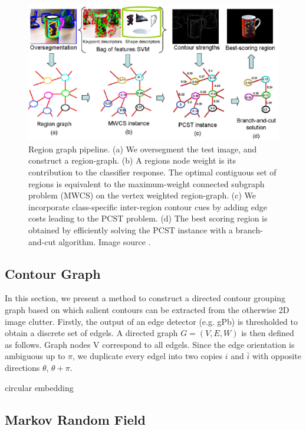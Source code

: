 \documentclass{SMBV12}
\begin{document}
\begin{figure}[htbp]
    \centering
    \includegraphics[width=\textwidth]{images/region_graph1.png}
    \caption{Region graph pipeline. (a) We oversegment the test image, and construct a region-graph. (b) A region\textquotesingle s node weight is its contribution to the classifier response. The optimal contiguous set of regions is equivalent to the maximum-weight connected subgraph problem (MWCS) on the vertex weighted region-graph. (c) We incorporate class-specific inter-region contour cues by adding edge costs leading to the PCST problem. (d) The best scoring region is obtained by efficiently solving the PCST instance with a branch-and-cut algorithm. Image source \cite{VijayGrauman2011}.}
    \label{fig:region_graph}
\end{figure}

\subsection{Contour Graph}

In this section, we present a method to construct a directed contour grouping graph \cite{zhu2007untangling} based on which salient contours can be extracted from the otherwise 2D image clutter. Firstly, the output of an edge detector (e.g. gPb) is thresholded to obtain a discrete set of edgels. A directed graph $G = (V,E,W)$ is then defined as follows. Graph nodes V correspond to all edgels. Since the edge orientation is ambiguous up to $\pi$, we duplicate every edgel into two copies $i$ and $\bar{i}$ with opposite directions $\theta$, $\theta + \pi$.

circular embedding

\subsection{Markov Random Field}
\end{document}

